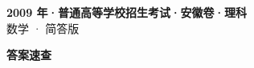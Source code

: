 \documentclass[zihao=-4, a4paper]{ctexart}
\begin{document}
\begin{center}
  {\Large\bfseries 2009 年·普通高等学校招生考试·安徽卷·理科}\\[4pt]
  {\large 数学 · 简答版}
\end{center}
\medskip
{}

\clearpage
{}
\begin{center}{\Large\bfseries 答案速查}\end{center}
\medskip

\end{document}
